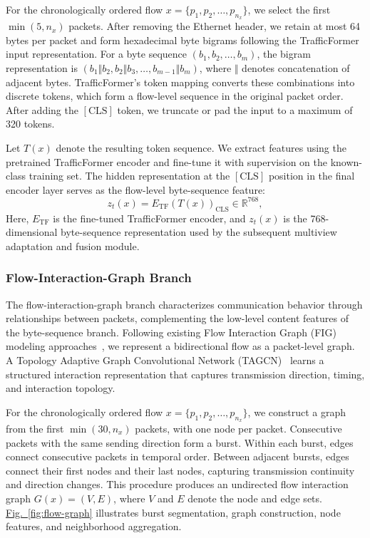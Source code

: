 For the chronologically ordered flow $x=\{p_1,p_2,\ldots,p_{n_x}\}$, we select the first $\min(5,n_x)$ packets. After removing the Ethernet header, we retain at most 64 bytes per packet and form hexadecimal byte bigrams following the TrafficFormer input representation. For a byte sequence $(b_1,b_2,\ldots,b_m)$, the bigram representation is $(b_1\Vert b_2,b_2\Vert b_3,\ldots,b_{m-1}\Vert b_m)$, where $\Vert$ denotes concatenation of adjacent bytes. TrafficFormer's token mapping converts these combinations into discrete tokens, which form a flow-level sequence in the original packet order. After adding the $[\mathrm{CLS}]$ token, we truncate or pad the input to a maximum of 320 tokens.

Let $T(x)$ denote the resulting token sequence. We extract features using the pretrained TrafficFormer encoder and fine-tune it with supervision on the known-class training set. The hidden representation at the $[\mathrm{CLS}]$ position in the final encoder layer serves as the flow-level byte-sequence feature:
\begin{equation}
z_t(x)=E_{\mathrm{TF}}\!\left(T(x)\right)_{\mathrm{CLS}}
\in\mathbb{R}^{768},
\tag{2}
\end{equation}
Here, $E_{\mathrm{TF}}$ is the fine-tuned TrafficFormer encoder, and $z_t(x)$ is the 768-dimensional byte-sequence representation used by the subsequent multiview adaptation and fusion module.

\subsubsection{Flow-Interaction-Graph Branch}
The flow-interaction-graph branch characterizes communication behavior through relationships between packets, complementing the low-level content features of the byte-sequence branch. Following existing Flow Interaction Graph (FIG) modeling approaches~, we represent a bidirectional flow as a packet-level graph. A Topology Adaptive Graph Convolutional Network (TAGCN)~ learns a structured interaction representation that captures transmission direction, timing, and interaction topology.

For the chronologically ordered flow $x=\{p_1,p_2,\ldots,p_{n_x}\}$, we construct a graph from the first $\min(30,n_x)$ packets, with one node per packet. Consecutive packets with the same sending direction form a burst. Within each burst, edges connect consecutive packets in temporal order. Between adjacent bursts, edges connect their first nodes and their last nodes, capturing transmission continuity and direction changes. This procedure produces an undirected flow interaction graph $G(x)=(V,E)$, where $V$ and $E$ denote the node and edge sets. \hyperref[fig:flow-graph]{Fig.~\ref*{fig:flow-graph}} illustrates burst segmentation, graph construction, node features, and neighborhood aggregation.

